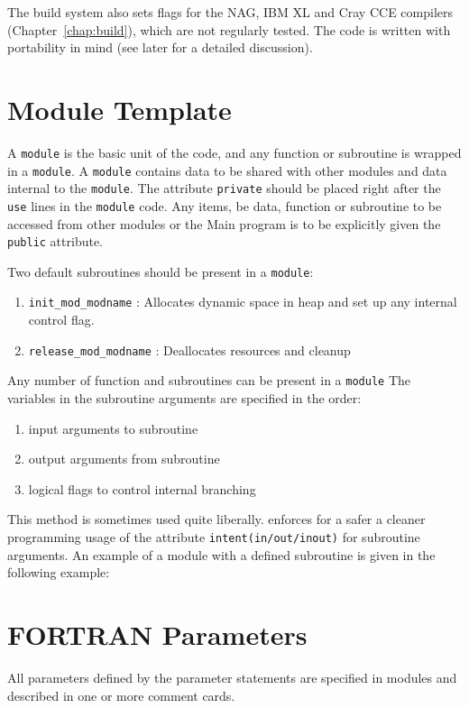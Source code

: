 The build system also sets flags for the NAG, IBM XL and Cray CCE compilers
(Chapter~\ref{chap:build}), which are not regularly tested. The code is
written with portability in mind (see later for a detailed discussion).

\section{Module Template}

A \verb=module= is the basic unit of the code, and any function or subroutine is
wrapped in a \verb=module=. A \verb=module= contains data to be shared with
other \PR modules and data internal to the \verb=module=. The \fort attribute
\verb=private= should be placed right after the \verb=use= lines in the
\verb=module= code. Any items, be data, function or subroutine to be accessed
from other modules or the Main program is to be explicitly given the 
\verb=public= attribute.

Two default subroutines should be present in a \verb=module=:

\begin{enumerate}
\item \verb=init_mod_modname= : Allocates dynamic space in heap and set up any
internal control flag.
\item \verb=release_mod_modname= : Deallocates resources and cleanup
\end{enumerate}

Any number of function and subroutines can be present in a \verb=module=
The variables in the subroutine arguments are specified in the order:

\begin{enumerate}
\item input arguments to subroutine
\item output arguments from subroutine
\item logical flags to control internal branching
\end{enumerate}

This method is sometimes used quite liberally. 
\PR enforces for a safer a cleaner programming usage of the \fort
attribute \verb=intent(in/out/inout)= for subroutine arguments.  
An example of a module with a defined subroutine is given in the following
example:



\section{FORTRAN Parameters}
All parameters defined by the \fort parameter statements are specified
in modules and described in one or more comment cards.

